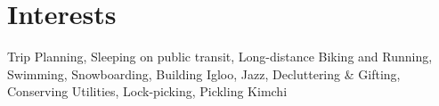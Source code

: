 \documentclass[letterpaper,10pt]{article}
\newcommand{\sectionspace}{
\vspace{-8pt}
}
\begin{document}
\vspace{-6pt}
\section{Interests}
\begin{itemize}[leftmargin=0.15in, label={}]
    {\item{
     {Trip Planning, Sleeping on public transit, Long-distance Biking and Running, Swimming, Snowboarding, Building Igloo, Jazz, Decluttering \& Gifting, Conserving Utilities, Lock-picking, Pickling Kimchi} \\ 
    }}
 \end{itemize}
 \sectionspace
\end{document}
